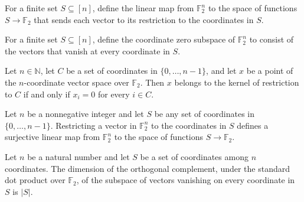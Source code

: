 \begin{definition}
\leanok
{}
For a finite set $S\subseteq[n]$, define the linear map from $\mathbb{F}_2^n$ to the
space of functions $S\to\mathbb{F}_2$ that sends each vector to its restriction to the
coordinates in $S$.
\end{definition}

\begin{definition}
\leanok
{}
For a finite set $S\subseteq[n]$, define the coordinate zero subspace of
$\mathbb{F}_2^n$ to consist of the vectors that vanish at every coordinate in $S$.
\end{definition}

\begin{theorem}
\leanok
{}
Let $n\in\mathbb N$, let $C$ be a set of coordinates in $\{0,\ldots,n-1\}$, and let $x$
be a point of the $n$-coordinate vector space over $\mathbb F_2$. Then $x$ belongs to
the kernel of restriction to $C$ if and only if $x_i=0$ for every $i\in C$.
\end{theorem}

\begin{theorem}
\leanok
{}
Let $n$ be a nonnegative integer and let $S$ be any set of coordinates in
$\{0,\ldots,n-1\}$. Restricting a vector in $\mathbb F_2^n$ to the coordinates in $S$
defines a surjective linear map from $\mathbb F_2^n$ to the space of functions
$S\to\mathbb F_2$.
\end{theorem}

\begin{theorem}
\leanok
{}
Let $n$ be a natural number and let $S$ be a set of coordinates among $n$ coordinates.
The dimension of the orthogonal complement, under the standard dot product over
$\mathbb{F}_2$, of the subspace of vectors vanishing on every coordinate in $S$ is
$|S|$.
\end{theorem}

